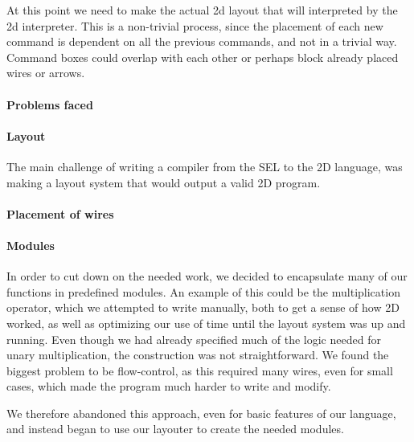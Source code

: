 At this point we need to make the actual 2d layout that will
interpreted by the 2d interpreter. This is a non-trivial process,
since the placement of each new command is dependent on all the
previous commands, and not in a trivial way. Command boxes could
overlap with each other or perhaps block already placed wires or
arrows.

\paragraph{Problems faced}
\label{compiler:problems}

\paragraph{Layout}
\label{compiler:layout}
The main challenge of writing a compiler from the SEL to the 2D
language, was making a layout system that would output a valid 2D program.

\paragraph{Placement of wires}
\label{compiler:placement}


\paragraph{Modules}
\label{compiler:modules}
In order to cut down on the needed work, we decided to encapsulate
many of our functions in predefined modules. An example of this could
be the multiplication operator, which we attempted to write manually,
both to get a sense of how 2D worked, as well as optimizing our use of
time until the layout system was up and running. Even though we had
already specified much of the logic needed for unary multiplication,
the construction was not straightforward. We found the biggest
problem to be flow-control, as this required many wires, even for
small cases, which made the program much harder to write and modify.

We therefore abandoned this approach, even for basic features of our
language, and instead began to use our layouter to create the needed
modules.

